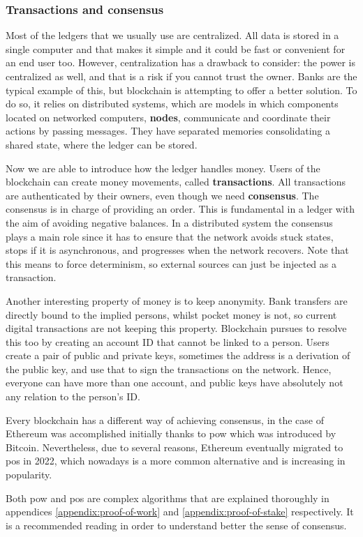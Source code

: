 \subsubsection{Transactions and consensus}
{Most of the ledgers that we usually use are centralized. All data is stored in a single computer and that makes it simple and it could be fast or convenient for an end user too. However, centralization has a drawback to consider: the power is centralized as well, and that is a risk if you cannot trust the owner. Banks are the typical example of this, but blockchain is attempting to offer a better solution. To do so, it relies on distributed systems, which are models in which components located on networked computers, \textbf{nodes}, communicate and coordinate their actions by passing messages. They have separated memories consolidating a shared state, where the ledger can be stored.

Now we are able to introduce how the ledger handles money. Users of the blockchain can create money movements, called \textbf{transactions}. All transactions are authenticated by their owners, even though we need \textbf{consensus}. The consensus is in charge of providing an order. This is fundamental in a ledger with the aim of avoiding negative balances. In a distributed system the consensus plays a main role since it has to ensure that the network avoids stuck states, stops if it is asynchronous, and progresses when the network recovers. Note that this means to force determinism, so external sources can just be injected as a transaction.

Another interesting property of money is to keep anonymity. Bank transfers are directly bound to the implied persons, whilst pocket money is not, so current digital transactions are not keeping this property. Blockchain pursues to resolve this too by creating an account ID that cannot be linked to a person. Users create a pair of public and private keys, sometimes the address is a derivation of the public key, and use that to sign the transactions on the network. Hence, everyone can have more than one account, and public keys have absolutely not any relation to the person's ID. 

Every blockchain has a different way of achieving consensus, in the case of Ethereum was accomplished initially thanks to \acrfull{pow} which was introduced by Bitcoin. Nevertheless, due to several reasons, Ethereum eventually migrated to \acrfull{pos} in 2022, which nowadays is a more common alternative and is increasing in popularity.

Both \acrlong{pow} and \acrlong{pos} are complex algorithms that are explained thoroughly in appendices \ref{appendix:proof-of-work} and \ref{appendix:proof-of-stake} respectively. It is a recommended reading in order to understand better the sense of consensus. 
}


